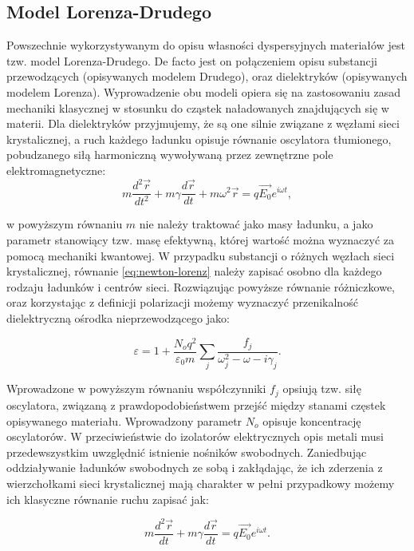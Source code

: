 \subsection{Model Lorenza-Drudego}
\label{subart:lorenz-drude}
Powszechnie wykorzystywanym do opisu własności dyspersyjnych materiałów jest tzw. model Lorenza-Drudego. De facto jest on połączeniem opisu substancji przewodzących (opisywanych modelem Drudego), oraz dielektryków (opisywanych modelem Lorenza). Wyprowadzenie obu modeli opiera się na zastosowaniu zasad mechaniki klasycznej w stosunku do cząstek naładowanych znajdujących się w materii. Dla dielektryków przyjmujemy, że są one silnie związane z węzłami sieci krystalicznej, a ruch każdego ładunku opisuje równanie oscylatora tłumionego, pobudzanego siłą harmoniczną wywoływaną przez zewnętrzne pole elektromagnetyczne:
\begin{equation}
m \frac{d^2 \vec{r}}{dt^2} + m \gamma \frac{d \vec{r}}{dt} + m \omega^2 \vec{r} = q \vec{E_0} e^{i \omega t},
\label{eq:newton-lorenz}
\end{equation}

w powyższym równaniu $m$ nie należy traktować jako masy ładunku, a jako parametr stanowiący tzw. masę efektywną, której wartość można wyznaczyć za pomocą mechaniki kwantowej. W przypadku substancji o różnych węzłach sieci krystalicznej, równanie \ref{eq:newton-lorenz} należy zapisać osobno dla każdego rodzaju ładunków i centrów sieci. Rozwiązując powyższe równanie różniczkowe, oraz korzystając z definicji polarizacji możemy wyznaczyć przenikalność dielektryczną ośrodka nieprzewodzącego jako:

\begin{equation}
\varepsilon = 1 + \frac{N_o q^2}{\varepsilon_0 m} \sum_j \frac{f_j}{\omega_j^2 - \omega - i \gamma_j}.
\label{eq:lorenz}
\end{equation}

Wprowadzone w powyższym równaniu współczynniki $f_j$ opsiują tzw. siłę oscylatora, związaną z prawdopodobieństwem przejść między stanami częstek opisywanego materiału. Wprowadzony parametr $N_o$ opisuje koncentrację oscylatorów.  W przeciwieństwie do izolatorów elektrycznych opis metali musi przedewszystkim uwzględnić istnienie nośników swobodnych. Zaniedbując oddziaływanie ładunków swobodnych ze sobą i zakłądając, że ich zderzenia z wierzchołkami sieci krystalicznej mają charakter w pełni przypadkowy możemy ich klasyczne równanie ruchu zapisać jak:

\begin{equation}
m \frac{d^2\vec{r}}{dt} + m \gamma \frac{d\vec{r}}{dt} = q \vec{E_0}e^{i\omega t}.
\label{eq:newton-drude}
\end{equation}

